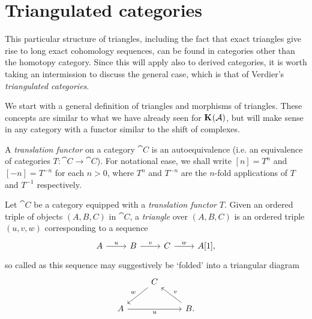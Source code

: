 \section{Triangulated categories}
\label{sect_triangcat}

This particular structure of triangles, including the fact that exact
triangles give rise to long exact cohomology sequences, can be found
in categories other than the homotopy category.
Since this will apply also to derived categories, it is worth taking
an intermission to discuss the general case, which is that of
Verdier's \emph{triangulated categories}.

We start with a general definition of triangles and morphisms of triangles.
These concepts are similar to what we have already seen for
${\mathbf{K}}^{{}}({\mathcal{A}})$, but will make sense in any category with a
functor similar to the shift of complexes.

\begin{definition}
  A \emph{translation functor} on a category $\cat{C}$ is an
  autoequivalence (i.e. an equivalence of categories $T: \cat{C} \to \cat{C}$).
  For notational ease, we shall write $[n] = T^n$ and $[-n] = T^{-n}$
  for each $n > 0$, where $T^n$ and $T^{-n}$ are the $n$-fold
  applications of $T$ and $T^{-1}$ respectively.
\end{definition}

\begin{definition}
  Let $\cat{C}$ be a category equipped with a \emph{translation functor} $T$.
  Given an ordered triple of objects $(A, B, C)$ in $\cat{C}$, a
  \emph{triangle} over $(A, B, C)$ is an ordered triple $(u, v, w)$
  corresponding to a sequence
  \[
    \begin{tikzcd}
      A \arrow[r, "u"]
      & B \arrow[r, "v"]
      & C \arrow[r, "w"]
      & A[1],
    \end{tikzcd}
  \]
  so called as this sequence may suggestively be `folded' into a
  triangular diagram
  \[
    \begin{tikzcd}
      & C \\
      A && B.
      \arrow["w"', from=1-2, to=2-1]
      \arrow["u"', from=2-1, to=2-3]
      \arrow["v"', from=2-3, to=1-2]
    \end{tikzcd}
  \]
\end{definition}

